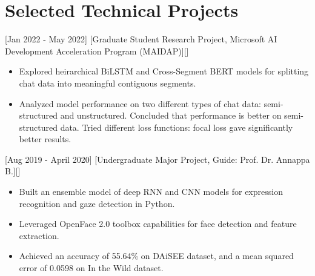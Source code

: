 \documentclass{article}
\begin{document}



\section{Selected Technical Projects}

[Jan 2022 - May 2022]
[Graduate Student Research Project, Microsoft AI Development Acceleration Program (MAIDAP)][]
\begin{itemize}
\item Explored heirarchical BiLSTM and Cross-Segment BERT models for splitting chat data into meaningful contiguous segments.
\item Analyzed model performance on two different types of chat data: semi-structured and unstructured. Concluded that performance is better on semi-structured data. Tried different loss functions: focal loss gave significantly better results.
\end{itemize}

[Aug 2019 - April 2020]
[Undergraduate Major Project, Guide: Prof. Dr. Annappa B.][]
\begin{itemize}
\item Built an ensemble model of deep RNN and CNN models for expression recognition and gaze detection in Python.
\item Leveraged OpenFace 2.0 toolbox capabilities for face detection and feature extraction.
\item Achieved an accuracy of 55.64\% on DAiSEE dataset, and a mean squared error of 0.0598 on In the Wild dataset.
\end{itemize}

\end{document}
